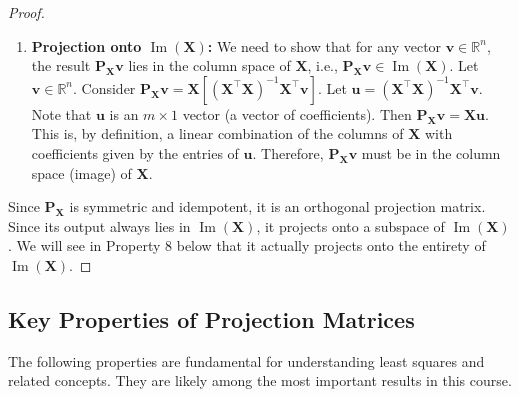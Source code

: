 \documentclass[11pt, a4paper]{article}
\DeclareMathOperator{\Image}{\mathrm{Im}}        %
\theoremstyle{definition}
\theoremstyle{remark}
\newcommand{\RR}{\mathbb{R}}             %
\newcommand{\mat}[1]{\mathbf{#1}}       %
\newcommand{\vect}[1]{\bm{#1}}          %
\newcommand{\transpose}{^{\top}}        %
\begin{document}
\begin{proof}
\begin{enumerate}
    \item \textbf{Projection onto $\Image(\mat{X})$:} We need to show that for any vector $\vect{v} \in \RR^n$, the result $\mat{P}_{\mat{X}}\vect{v}$ lies in the column space of $\mat{X}$, i.e., $\mat{P}_{\mat{X}}\vect{v} \in \Image(\mat{X})$.
    Let $\vect{v} \in \RR^n$. Consider $\mat{P}_{\mat{X}}\vect{v} = \mat{X} [(\mat{X}\transpose \mat{X})^{-1} \mat{X}\transpose \vect{v}]$.
    Let $\vect{u} = (\mat{X}\transpose \mat{X})^{-1} \mat{X}\transpose \vect{v}$. Note that $\vect{u}$ is an $m \times 1$ vector (a vector of coefficients).
    Then $\mat{P}_{\mat{X}}\vect{v} = \mat{X} \vect{u}$. This is, by definition, a linear combination of the columns of $\mat{X}$ with coefficients given by the entries of $\vect{u}$. Therefore, $\mat{P}_{\mat{X}}\vect{v}$ must be in the column space (image) of $\mat{X}$.
\end{enumerate}
Since $\mat{P}_{\mat{X}}$ is symmetric and idempotent, it is an orthogonal projection matrix. Since its output always lies in $\Image(\mat{X})$, it projects onto a subspace of $\Image(\mat{X})$. We will see in Property 8 below that it actually projects onto the entirety of $\Image(\mat{X})$.
\end{proof}

\subsection{Key Properties of Projection Matrices}

The following properties are fundamental for understanding least squares and related concepts. They are likely among the most important results in this course.
\end{document}
